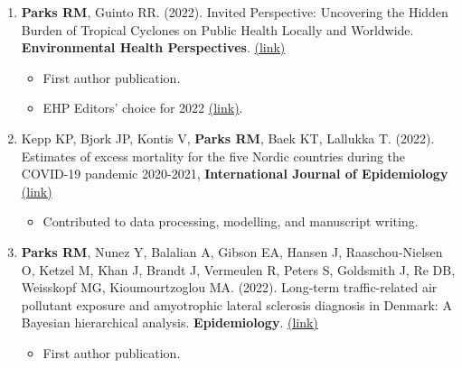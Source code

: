 \begin{enumerate}
    \item \textbf{Parks RM}, Guinto RR. (2022). Invited Perspective: Uncovering the Hidden Burden of Tropical Cyclones on Public Health Locally and Worldwide. \textbf{Environmental Health Perspectives}. \href{https://ehp.niehs.nih.gov/doi/10.1289/EHP12241}{(link)} 

    \begin{itemize}
    \item First author publication.
        \item EHP Editors' choice for 2022 \href{https://ehp.niehs.nih.gov/curated-collections/eds-choice-2022}{(link)}.
    \end{itemize}

     \item Kepp KP, Bjork JP, Kontis V, \textbf{Parks RM}, Baek KT, Lallukka T. (2022). Estimates of excess mortality for the five Nordic countries during the COVID-19 pandemic 2020-2021, \textbf{International Journal of Epidemiology} \href{https://academic.oup.com/ije/advance-article/doi/10.1093/ije/dyac204/6798817#379089278}{(link)}

    \begin{itemize}
        \item Contributed to data processing, modelling, and manuscript writing.
    \end{itemize}

     \item \textbf{Parks RM}, Nunez Y, Balalian A,  Gibson EA, Hansen J, Raaschou-Nielsen O, Ketzel M, Khan J, Brandt J, Vermeulen R, Peters S, Goldsmith J, Re DB, Weisskopf MG, Kioumourtzoglou MA. (2022). Long-term traffic-related air pollutant exposure and amyotrophic lateral sclerosis diagnosis in Denmark: A Bayesian hierarchical analysis. \textbf{Epidemiology}. \href{https://journals.lww.com/epidem/Abstract/9900/Long_term_traffic_related_air_pollutant_exposure.55.aspx}{(link)}

\begin{itemize}
    \item First author publication.
\end{itemize}


\end{enumerate}
